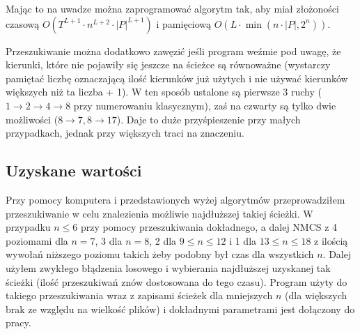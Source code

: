 \documentclass{pracamgr}
\begin{document}
     Mając to na uwadze można zaprogramować algorytm tak, aby miał złożoności czasową $O(T^{L+1}\cdot n^{L+2}\cdot|P|^{L+1})$
     i pamięciową $O(L\cdot \min(n\cdot |P|,2^n))$.\newline
     
     Przeszukiwanie można dodatkowo zawęzić jeśli program weźmie pod uwagę, że kierunki, które nie pojawiły się jeszcze na ścieżce są równoważne
     (wystarczy pamiętać liczbę oznaczającą ilość kierunków już użytych i nie używać kierunków większych niż ta liczba + 1).
     W ten sposób ustalone są pierwsze 3 ruchy ($1\rightarrow2\rightarrow4\rightarrow8$ przy numerowaniu klasycznym),
     zaś na czwarty są tylko dwie możliwości ($8\rightarrow7,8\rightarrow17$). Daje to duże przyśpieszenie przy małych przypadkach,
     jednak przy większych traci na znaczeniu.
    \subsection{Uzyskane wartości}
     Przy pomocy komputera i przedstawionych wyżej algorytmów przeprowadziłem przeszukiwanie w celu znalezienia możliwie najdłuższej takiej ścieżki.
     W przypadku $n\le6$ przy pomocy przeszukiwania dokładnego, a dalej NMCS z 4 poziomami dla $n=7$, 3 dla $n=8$, 2 dla $9\le n\le12$ i 1 dla $13\le n\le18$
     z ilością wywołań niższego poziomu takich żeby podobny był czas dla wszystkich $n$. Dalej użyłem zwykłego błądzenia losowego i wybierania najdłuższej
     uzyskanej tak ścieżki (ilość przeszukiwań znów dostosowana do tego czasu).
     Program użyty do takiego przeszukiwania wraz z zapisami ścieżek dla mniejszych $n$ (dla większych brak ze względu na wielkość plików)
     i dokładnymi parametrami jest dołączony do pracy.\newline
     
\end{document}
